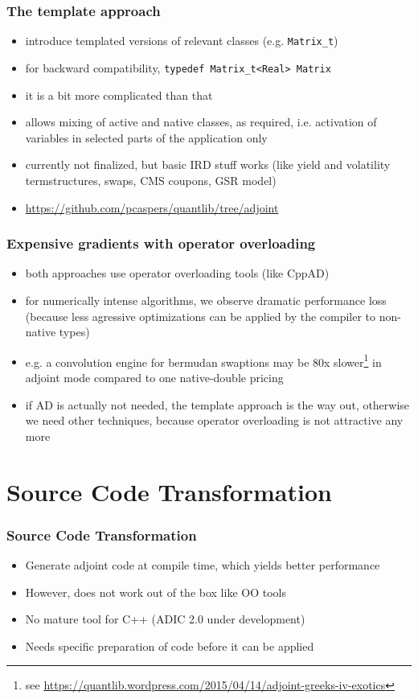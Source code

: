 \documentclass{beamer}
\begin{document}
\begin{frame}[fragile]
\frametitle{The template approach}
\begin{itemize}
\item introduce templated versions of relevant classes (e.g. \verb+Matrix_t+)
\item for backward compatibility, \verb+typedef Matrix_t<Real> Matrix+
\item it is a bit more complicated than that
\item allows mixing of active and native classes, as required, i.e. activation of variables in selected parts of the application only
\item currently not finalized, but basic IRD stuff works (like yield and volatility termstructures, swaps, CMS coupons, GSR model)
\item \url{https://github.com/pcaspers/quantlib/tree/adjoint}
\end{itemize}
\end{frame}

\begin{frame}[fragile]
\frametitle{Expensive gradients with operator overloading}
\begin{itemize}
\item both approaches use operator overloading tools (like CppAD)
\item for numerically intense algorithms, we observe dramatic performance loss (because less agressive optimizations can be applied by the compiler to non-native types)
\item e.g. a convolution engine for bermudan swaptions may be 80x slower\footnote{see \tiny\url{https://quantlib.wordpress.com/2015/04/14/adjoint-greeks-iv-exotics}}
in adjoint mode compared to one native-double pricing
\item if AD is actually not needed, the template approach is the way out, otherwise we need other techniques, because operator overloading is not attractive any more
\end{itemize}
\end{frame}

\section{Source Code Transformation}

\begin{frame}[fragile]
\frametitle{Source Code Transformation}
\begin{itemize}
\item Generate adjoint code at compile time, which yields better performance
\item However, does not work out of the box like OO tools
\item No mature tool for C++ (ADIC 2.0 under development)
\item Needs specific preparation of code before it can be applied
\end{itemize}
\end{frame}
\end{document}
